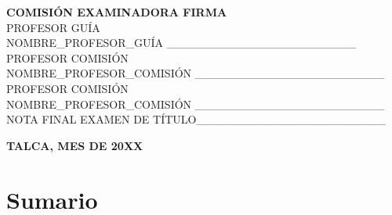 \documentclass[letterpaper, 12pt]{article}
\begin{document}
    \textbf{COMISIÓN EXAMINADORA \hfill FIRMA}\hspace*{2cm}\\

    PROFESOR GUÍA \hfill \\
    NOMBRE\_PROFESOR\_GUÍA \hfill \_\_\_\_\_\_\_\_\_\_\_\_\_\_\_\_\_\_\_\_\_\_\_ \\

    PROFESOR COMISIÓN \hfill \\
    NOMBRE\_PROFESOR\_COMISIÓN \hfill \_\_\_\_\_\_\_\_\_\_\_\_\_\_\_\_\_\_\_\_\_\_\_ \\

    PROFESOR COMISIÓN \hfill \\
    NOMBRE\_PROFESOR\_COMISIÓN \hfill \_\_\_\_\_\_\_\_\_\_\_\_\_\_\_\_\_\_\_\_\_\_\_ \\

    NOTA FINAL EXAMEN DE TÍTULO\hfill \_\_\_\_\_\_\_\_\_\_\_\_\_\_\_\_\_\_\_\_\_\_\_ \\

\vfill

\begin{center}
\textbf{TALCA, MES DE 20XX}
\end{center}




\newpage








\chapter*{Sumario}
\end{document}
